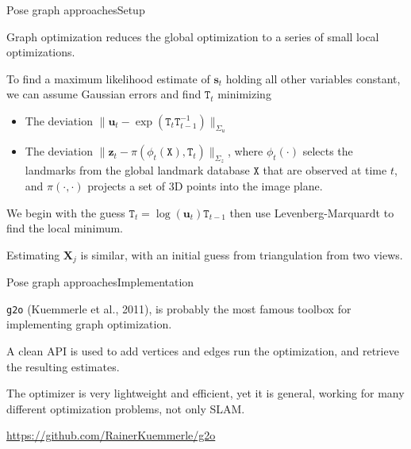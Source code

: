 \documentclass[aspectratio=169]{beamer}
\renewcommand{\vec}[1]{\boldsymbol{#1}}
\begin{document}
\begin{frame}{Pose graph approaches}{Setup}

  Graph optimization reduces the global optimization to a series
  of small local optimizations.

  \medskip
  
  To find a maximum likelihood estimate of $\vec{s}_t$ holding all
  other variables constant, we can assume Gaussian errors and find
  $\mathtt{T}_t$ minimizing
  \begin{itemize}
  \item The deviation $\| \vec{u}_t -
    \exp(\mathtt{T}_t\mathtt{T}_{t-1}^{-1}) \|_{\mathtt{\Sigma}_u}$
  \item The deviation $\| \vec{z}_t -
    \pi(\phi_t(\mathtt{X}),\mathtt{T}_t) \|_{\mathtt{\Sigma}_z}$,
    where $\phi_t(\cdot)$ selects the landmarks from the global
    landmark database $\mathtt{X}$ that are observed at time $t$, and
    $\pi(\cdot,\cdot)$ projects a set of 3D points into the image
    plane.
  \end{itemize}

  \medskip
  
  We begin with the guess $\mathtt{T}_t =
  \log(\vec{u}_t)\mathtt{T}_{t-1}$ then use Levenberg-Marquardt to find
  the local minimum.

  \medskip

  Estimating $\vec{X}_j$ is similar, with an initial guess from
  triangulation from two views.
  
\end{frame}


\begin{frame}{Pose graph approaches}{Implementation}

  \alert{\texttt{g2o}} (Kuemmerle et al., 2011), is probably the most
  famous toolbox for implementing graph optimization.

  \medskip

  A clean API is used to add vertices and edges run the optimization,
  and retrieve the resulting estimates.

  \medskip

  The optimizer is very lightweight and efficient, yet it is general,
  working for many different optimization problems, not only SLAM.

  \medskip

  \url{https://github.com/RainerKuemmerle/g2o}
  
\end{frame}
\end{document}

